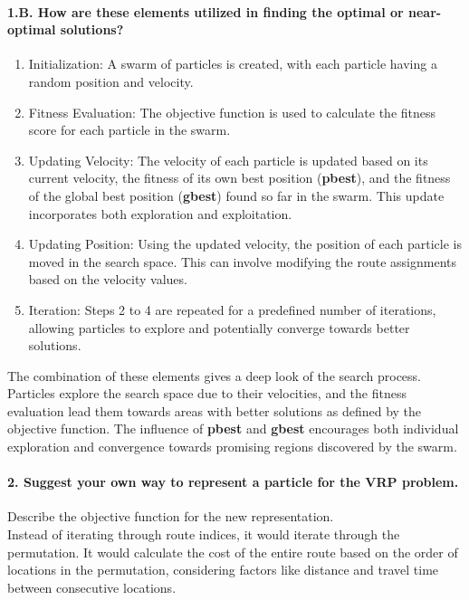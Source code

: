 \documentclass[letterpaper, 12pt]{article}
\begin{document}
\paragraph{1.B. How are these elements utilized in finding the optimal or near-optimal solutions?}

\begin{enumerate}
    \item Initialization: A swarm of particles is created, with each particle having a random position and velocity.
    \item Fitness Evaluation: The objective function is used to calculate the fitness score for each particle in the swarm.
    \item Updating Velocity: The velocity of each particle is updated based on its current velocity, the fitness of its own best position (\textbf{pbest}), and the fitness of the global best position (\textbf{gbest}) found so far in the swarm. This update incorporates both exploration and exploitation.
    \item Updating Position: Using the updated velocity, the position of each particle is moved in the search space. This can involve modifying the route assignments based on the velocity values.
    \item Iteration: Steps 2 to 4 are repeated for a predefined number of iterations, allowing particles to explore and potentially converge towards better solutions.
\end{enumerate}

The combination of these elements gives a deep look of the search process. Particles explore the search space due to their velocities, and the fitness evaluation lead them towards areas with better solutions as defined by the objective function. The influence of \textbf{pbest} and \textbf{gbest} encourages both individual exploration and convergence towards promising regions discovered by the swarm. \\

\paragraph{2. Suggest your own way to represent a particle for the VRP problem.\\} Describe the objective function for the new representation. \\

 Instead of iterating through route indices, it would iterate through the permutation. It would calculate the cost of the entire route based on the order of locations in the permutation, considering factors like distance and travel time between consecutive locations.\\
\end{document}

